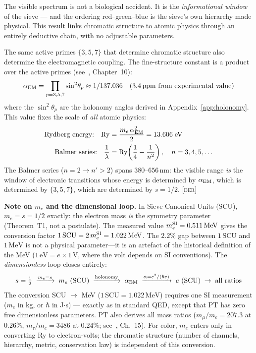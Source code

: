 \documentclass[12pt,a4paper]{article}
\begin{document}
The visible spectrum is not a biological accident. It is the
\emph{informational window} of the sieve --- and the ordering
red--green--blue is the sieve's own hierarchy made physical. This
result links chromatic structure to atomic physics through an entirely
deductive chain, with no adjustable parameters.

\begin{derivedbox}
The same active primes $\{3, 5, 7\}$ that determine chromatic
structure also determine the electromagnetic coupling. The
fine-structure constant is a product over the active primes
(see~\cite{senez2026math}, Chapter~10):
\begin{equation}
  \alpha_{\mathrm{EM}} = \prod_{p=3,5,7} \sin^2\!\theta_p
  \approx 1/137.036
  \quad\text{(3.4\,ppm from experimental value)}
  \label{eq:alpha}
\end{equation}
where the $\sin^2\!\theta_p$ are the holonomy angles derived in
Appendix~\ref{app:holonomy}. This value fixes the scale of
\emph{all} atomic physics:
\begin{align}
  \text{Rydberg energy:} \quad
  \mathrm{Ry} &= \frac{m_e\,\alpha_{\mathrm{EM}}^2}{2} = 13.606\;\mathrm{eV}
  \label{eq:rydberg} \\
  \text{Balmer series:} \quad
  \frac{1}{\lambda} &= \mathrm{Ry}\!\left(\frac{1}{4} - \frac{1}{n^2}\right),
  \quad n = 3, 4, 5, \ldots
  \label{eq:balmer}
\end{align}
The Balmer series ($n = 2 \to n' > 2$) spans $380$--$656\,\mathrm{nm}$:
the visible range \emph{is} the window of electronic transitions
whose energy is determined by $\alpha_{\mathrm{EM}}$, which is determined by
$\{3, 5, 7\}$, which are determined by $s = 1/2$. \textsc{[der]}

\medskip\noindent
\textbf{Note on $m_e$ and the dimensional loop.}\quad
In Sieve Canonical Units (SCU), $m_e = s = 1/2$ exactly: the electron
mass \emph{is} the symmetry parameter (Theorem~T1, not a postulate).
The measured value $m_e^{\rm SI} = 0.511\,\mathrm{MeV}$ gives the
conversion factor
$1\,\mathrm{SCU} = 2\,m_e^{\rm SI} = 1.022\,\mathrm{MeV}$.
The $2.2\%$ gap between $1\,\mathrm{SCU}$ and $1\,\mathrm{MeV}$ is
not a physical parameter---it is an artefact of the historical
definition of the MeV ($1\,\mathrm{eV} = e \times 1\,\mathrm{V}$,
where the volt depends on SI conventions). The \emph{dimensionless} loop closes entirely:
\[
  s = \tfrac{1}{2}
  \;\xrightarrow{m_e = s}\;
  m_e \text{ (SCU)}
  \;\xrightarrow{\text{holonomy}}\;
  \alpha_{\mathrm{EM}}
  \;\xrightarrow{\alpha = e^2/(\hbar c)}\;
  e \text{ (SCU)}
  \;\xrightarrow{}\;
  \text{all ratios}
\]
The conversion SCU $\to$ MeV
($1\,\mathrm{SCU} = 1.022\,\mathrm{MeV}$) requires one SI
measurement ($m_e$ in kg, or $\hbar$ in J$\cdot$s) --- exactly as in
standard QED, except that PT has zero free dimensionless parameters.
PT also derives all mass ratios ($m_\mu/m_e = 207.3$ at $0.26\%$,
$m_\tau/m_e = 3486$ at $0.24\%$;
see~\cite{senez2026math}, Ch.~15). For color, $m_e$ enters only in
converting Ry to electron-volts; the chromatic structure (number of
channels, hierarchy, metric, conservation law) is independent of this
conversion.
\end{derivedbox}
\end{document}
